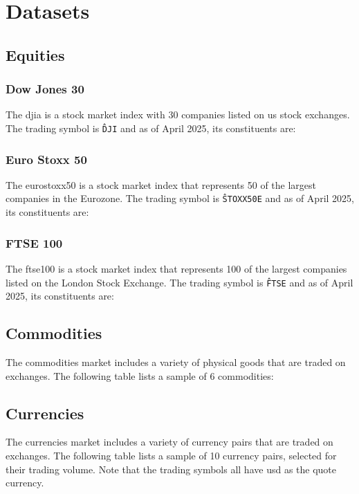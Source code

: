 \chapter{Datasets} \label{app:datasets}

\section{Equities} \label{sec:datasets-equities}
\subsection{Dow Jones 30} \label{sec:datasets-djia}

The \acrfull{djia} is a stock market index with 30 companies listed on \acrfull{us} stock exchanges. The trading symbol is \texttt{\^DJI} and as of April 2025, its constituents are: 



\subsection{Euro Stoxx 50} \label{sec:datasets-eurostoxx50}

The \acrfull{eurostoxx50} is a stock market index that represents 50 of the largest companies in the Eurozone. The trading symbol is \texttt{\^STOXX50E} and as of April 2025, its constituents are:



\subsection{FTSE 100} \label{sec:datasets-ftse100}

The \acrfull{ftse100} is a stock market index that represents 100 of the largest companies listed on the London Stock Exchange. The trading symbol is \texttt{\^FTSE} and as of April 2025, its constituents are:



\section{Commodities} \label{sec:datasets-commodities}

The commodities market includes a variety of physical goods that are traded on exchanges. The following table lists a sample of 6 commodities:



\section{Currencies} \label{sec:datasets-currencies}

The currencies market includes a variety of currency pairs that are traded on exchanges. The following table lists a sample of 10 currency pairs, selected for their trading volume. Note that the trading symbols all have \acrfull{usd} as the quote currency.


